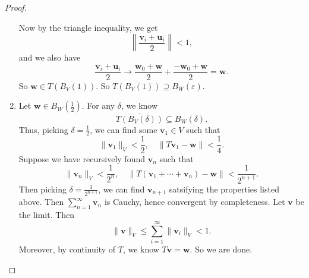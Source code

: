 \documentclass[a4paper]{article}
\begin{document}
\begin{proof}
\begin{enumerate}
      Now by the triangle inequality, we get
      \[
        \left\|\frac{\mathbf{v}_i + \mathbf{u}_i}{2}\right\| < 1,
      \]
      and we also have
      \[
        \frac{\mathbf{v}_i + \mathbf{u}_i}{2} \to \frac{\mathbf{w}_0 + \mathbf{w}}{2} + \frac{-\mathbf{w}_0 + \mathbf{w}}{2} = \mathbf{w}.
      \]
      So $\mathbf{w}\in \overline{T(B_V(1))}$. So $\overline{T(B_V(1))} \supseteq B_W(\varepsilon)$.
    \item Let $\mathbf{w} \in B_W(\frac{1}{2})$. For any $\delta$, we know
      \[
        \overline{T(B_V(\delta))} \subseteq B_W(\delta).
      \]
      Thus, picking $\delta = \frac{1}{2}$, we can find some $\mathbf{v}_1 \in V$ such that
      \[
        \|\mathbf{v}_1\|_V < \frac{1}{2},\quad \|T \mathbf{v}_1 - \mathbf{w}\| < \frac{1}{4}.
      \]
      Suppose we have recursively found $\mathbf{v}_n$ such that
      \[
        \|\mathbf{v}_n\|_V < \frac{1}{2^n},\quad \|T (\mathbf{v}_1 + \cdots + \mathbf{v}_n) - \mathbf{w}\| < \frac{1}{2^{n + 1}}.
      \]
      Then picking $\delta = \frac{1}{2^{n + 1}}$, we can find $\mathbf{v}_{n + 1}$ satsifying the properties listed above. Then $\sum_{n = 1}^\infty \mathbf{v}_n$ is Cauchy, hence convergent by completeness. Let $\mathbf{v}$ be the limit. Then 
      \[
        \|\mathbf{v}\|_V \leq \sum_{i = 1}^\infty \|\mathbf{v}_i\|_V < 1.
      \]
      Moreover, by continuity of $T$, we know $T\mathbf{v} = \mathbf{w}$. So we are done.
%
%
%

\end{enumerate}
\end{proof}
\end{document}

